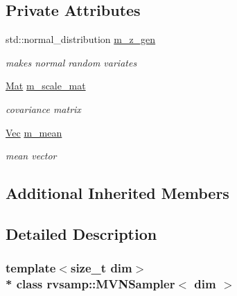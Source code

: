 \subsection*{Private Attributes}
\begin{DoxyCompactItemize}
\item 
std\+::normal\+\_\+distribution \hyperlink{classrvsamp_1_1MVNSampler_a50d155285daecf67c8fe379eed9c5b54}{m\+\_\+z\+\_\+gen}\hypertarget{classrvsamp_1_1MVNSampler_a50d155285daecf67c8fe379eed9c5b54}{}\label{classrvsamp_1_1MVNSampler_a50d155285daecf67c8fe379eed9c5b54}

\begin{DoxyCompactList}\small\item\em makes normal random variates \end{DoxyCompactList}\item 
\hyperlink{classrvsamp_1_1MVNSampler_ae20b2ea3c308b2a687ed667b72ff8bb8}{Mat} \hyperlink{classrvsamp_1_1MVNSampler_aab577c7ea778843db94327aba3be2bc7}{m\+\_\+scale\+\_\+mat}\hypertarget{classrvsamp_1_1MVNSampler_aab577c7ea778843db94327aba3be2bc7}{}\label{classrvsamp_1_1MVNSampler_aab577c7ea778843db94327aba3be2bc7}

\begin{DoxyCompactList}\small\item\em covariance matrix \end{DoxyCompactList}\item 
\hyperlink{classrvsamp_1_1MVNSampler_a07a367332a2524d307ca2ee2c5b670cd}{Vec} \hyperlink{classrvsamp_1_1MVNSampler_a02f7e74450ba7557c93a46b526ea6c0f}{m\+\_\+mean}\hypertarget{classrvsamp_1_1MVNSampler_a02f7e74450ba7557c93a46b526ea6c0f}{}\label{classrvsamp_1_1MVNSampler_a02f7e74450ba7557c93a46b526ea6c0f}

\begin{DoxyCompactList}\small\item\em mean vector \end{DoxyCompactList}\end{DoxyCompactItemize}
\subsection*{Additional Inherited Members}


\subsection{Detailed Description}
\subsubsection*{template$<$size\+\_\+t dim$>$\\*
class rvsamp\+::\+M\+V\+N\+Sampler$<$ dim $>$}

